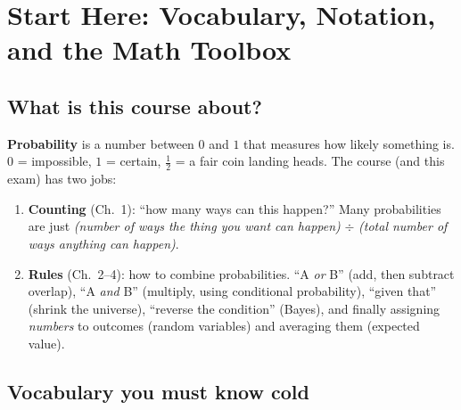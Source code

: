 \documentclass[11pt]{article}
\let\oldsubsection\subsection
\renewcommand{\subsection}{\Needspace{14\baselineskip}\oldsubsection}
\begin{document}
\section{Start Here: Vocabulary, Notation, and the Math Toolbox}\label{sec:primer}

\subsection{What is this course about?}

\begin{ideabox}
\textbf{Probability} is a number between $0$ and $1$ that measures how likely something is. $0$ = impossible, $1$ = certain, $\tfrac12$ = a fair coin landing heads. The course (and this exam) has two jobs:
\begin{enumerate}
\item \textbf{Counting} (Ch.~1): ``how many ways can this happen?'' Many probabilities are just \emph{(number of ways the thing you want can happen)} $\div$ \emph{(total number of ways anything can happen)}.
\item \textbf{Rules} (Ch.~2--4): how to combine probabilities. ``A \emph{or} B'' (add, then subtract overlap), ``A \emph{and} B'' (multiply, using conditional probability), ``given that'' (shrink the universe), ``reverse the condition'' (Bayes), and finally assigning \emph{numbers} to outcomes (random variables) and averaging them (expected value).
\end{enumerate}
\end{ideabox}

\subsection{Vocabulary you must know cold}
\end{document}
